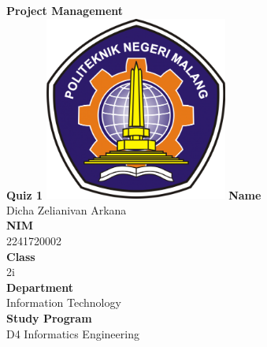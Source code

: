 \documentclass[12pt,titlepage]{article}
\newcommand{\vSubject}{Project Management}
\newcommand{\vSubtitle}{Quiz 1}
\newcommand{\vName}{Dicha Zelianivan Arkana}
\newcommand{\vNIM}{2241720002}
\newcommand{\vClass}{2i}
\newcommand{\vDepartment}{Information Technology}
\newcommand{\vStudyProgram}{D4 Informatics Engineering}
\begin{document}
\begin{titlepage}
    \centering
    \vfill
    {\bfseries\LARGE
        \vSubject\\
        \vskip0.25cm
        \vSubtitle
    }
    \vfill
    \includegraphics[width=6cm]{images/polinema-logo.png}
    \vfill
    {
        \textbf{Name}\\
        \vName\\
        \vskip0.5cm
        \textbf{NIM}\\
        \vNIM\\
        \vskip0.5cm
        \textbf{Class}\\
        \vClass\\
        \vskip0.5cm
        \textbf{Department}\\
        \vDepartment\\
        \vskip0.5cm
        \textbf{Study Program}\\
        \vStudyProgram
    }
\end{titlepage}
\end{document}
